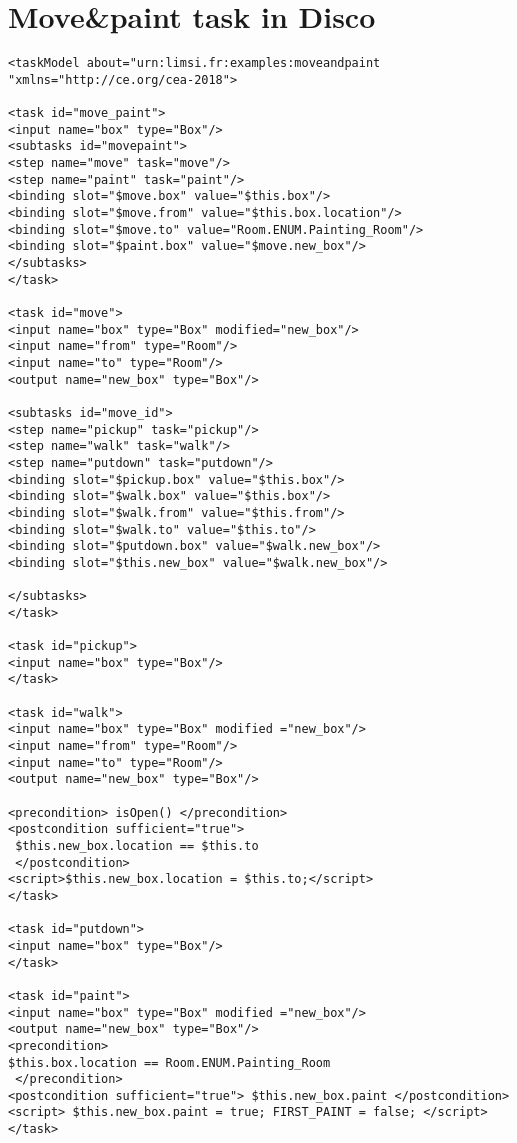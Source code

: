 
\chapter{Move\&paint task in Disco} %

\label{xml} %

\begin{verbatim}
<taskModel about="urn:limsi.fr:examples:moveandpaint
"xmlns="http://ce.org/cea-2018">

<task id="move_paint">
<input name="box" type="Box"/>
<subtasks id="movepaint">
<step name="move" task="move"/>
<step name="paint" task="paint"/>
<binding slot="$move.box" value="$this.box"/>
<binding slot="$move.from" value="$this.box.location"/>
<binding slot="$move.to" value="Room.ENUM.Painting_Room"/>
<binding slot="$paint.box" value="$move.new_box"/>
</subtasks>
</task>

<task id="move">
<input name="box" type="Box" modified="new_box"/>
<input name="from" type="Room"/>
<input name="to" type="Room"/>
<output name="new_box" type="Box"/>

<subtasks id="move_id">
<step name="pickup" task="pickup"/>
<step name="walk" task="walk"/>
<step name="putdown" task="putdown"/>
<binding slot="$pickup.box" value="$this.box"/>
<binding slot="$walk.box" value="$this.box"/>
<binding slot="$walk.from" value="$this.from"/>
<binding slot="$walk.to" value="$this.to"/>
<binding slot="$putdown.box" value="$walk.new_box"/>
<binding slot="$this.new_box" value="$walk.new_box"/>

</subtasks>
</task>

<task id="pickup">
<input name="box" type="Box"/>
</task>  

<task id="walk">
<input name="box" type="Box" modified ="new_box"/>
<input name="from" type="Room"/>
<input name="to" type="Room"/>
<output name="new_box" type="Box"/>

<precondition> isOpen() </precondition> 
<postcondition sufficient="true">
 $this.new_box.location == $this.to
 </postcondition> 
<script>$this.new_box.location = $this.to;</script>
</task>

<task id="putdown">
<input name="box" type="Box"/>
</task>

<task id="paint">
<input name="box" type="Box" modified ="new_box"/>
<output name="new_box" type="Box"/>
<precondition> 
$this.box.location == Room.ENUM.Painting_Room
 </precondition>
<postcondition sufficient="true"> $this.new_box.paint </postcondition>
<script> $this.new_box.paint = true; FIRST_PAINT = false; </script>
</task>


\end{verbatim}
